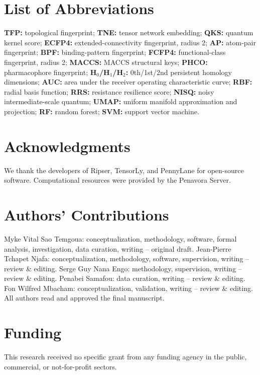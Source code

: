 \documentclass[11pt,a4paper]{article}
\begin{document}
\section*{List of Abbreviations}

\textbf{TFP:} topological fingerprint; \textbf{TNE:} tensor network embedding; \textbf{QKS:} quantum kernel score; \textbf{ECFP4:} extended-connectivity fingerprint, radius 2; \textbf{AP:} atom-pair fingerprint; \textbf{BPF:} binding-pattern fingerprint; \textbf{FCFP4:} functional-class fingerprint, radius 2; \textbf{MACCS:} MACCS structural keys; \textbf{PHCO:} pharmacophore fingerprint; \textbf{H$_0$/H$_1$/H$_2$:} 0th/1st/2nd persistent homology dimensions; \textbf{AUC:} area under the receiver operating characteristic curve; \textbf{RBF:} radial basis function; \textbf{RRS:} resistance resilience score; \textbf{NISQ:} noisy intermediate-scale quantum; \textbf{UMAP:} uniform manifold approximation and projection; \textbf{RF:} random forest; \textbf{SVM:} support vector machine.

\section*{Acknowledgments}

We thank the developers of Ripser, TensorLy, and PennyLane for open-source software. Computational resources were provided by the Penavora Server.

\section*{Authors' Contributions}

Myke Vital Sao Temgoua: conceptualization, methodology, software, formal analysis, investigation, data curation, writing -- original draft. Jean-Pierre Tchapet Njafa: conceptualization, methodology, software, supervision, writing -- review \& editing. Serge Guy Nana Engo: methodology, supervision, writing -- review \& editing. Penabei Samafou: data curation, writing -- review \& editing. Fon Wilfred Mbacham: conceptualization, validation, writing -- review \& editing. All authors read and approved the final manuscript.

\section*{Funding}

This research received no specific grant from any funding agency in the public, commercial, or not-for-profit sectors.
\end{document}
